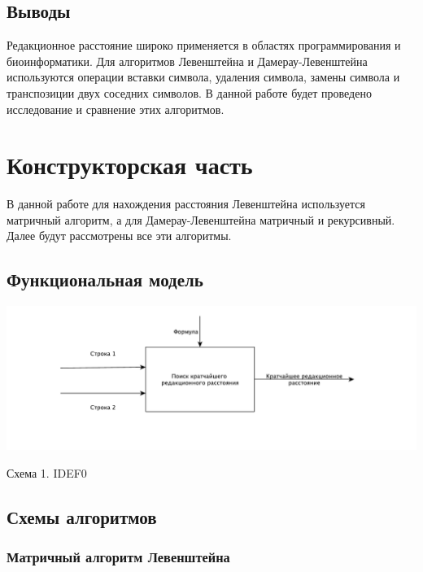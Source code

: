 \documentclass[a4paper,12pt]{article}
\begin{document}
\subsection{Выводы}

Редакционное расстояние широко применяется в областях программирования и
биоинформатики. Для алгоритмов Левенштейна и Дамерау-Левенштейна
используются операции вставки символа, удаления символа, замены символа и
транспозиции двух соседних символов. В данной работе будет проведено
исследование и сравнение этих алгоритмов.

\newpage
\section{Конструкторская часть}

В данной работе для нахождения расстояния Левенштейна используется матричный
алгоритм, а для Дамерау-Левенштейна матричный и рекурсивный. Далее будут
рассмотрены все эти алгоритмы.

\subsection{Функциональная модель}

\begin{center}
    \includegraphics[scale=0.5]{IDEF0}

    Схема 1. IDEF0
\end{center}

\subsection{Схемы алгоритмов}

\subsubsection{Матричный алгоритм Левенштейна}
\end{document}
